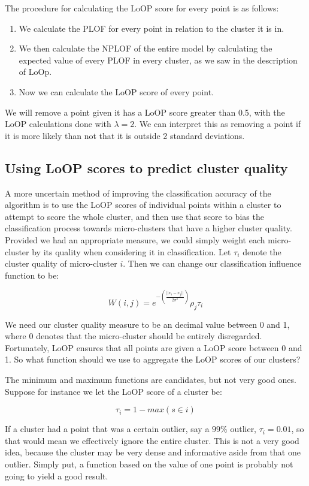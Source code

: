\documentclass[12pt,a4paper,oneside]{report}
\begin{document}
The procedure for calculating the LoOP score for every point is as follows:

\begin{enumerate}
\item We calculate the PLOF for every point in relation to the cluster it is in. 
\item We then calculate the NPLOF of the entire model by calculating the expected value of every PLOF in every cluster, as we saw in the description of LoOp. 
\item Now we can calculate the LoOP score of every point. 
\end{enumerate}

We will remove a point given it has a LoOP score greater than 0.5, with the LoOP calculations done with $\lambda = 2$. We can interpret this as removing a point if it is more likely than not that it is outside 2 standard deviations. 

\subsection{Using LoOP scores to predict cluster quality}

A more uncertain method of improving the classification accuracy of the algorithm is to use the LoOP scores of individual points within a cluster to attempt to score the whole cluster, and then use that score to bias the classification process towards micro-clusters that have a higher cluster quality. Provided we had an appropriate measure, we could simply weight each micro-cluster by its quality when considering it in classification. Let $\tau_i$ denote the cluster quality of micro-cluster $i$. Then we can change our classification influence function to be:

\[W(i,j) = e^{-(\frac{||x_i-x_j||}{2\sigma^2})}\rho_j\tau_i\]

We need our cluster quality measure to be an decimal value between 0 and 1, where 0 denotes that the micro-cluster should be entirely disregarded. Fortunately, LoOP ensures that all points are given a LoOP score between 0 and 1. So what function should we use to aggregate the LoOP scores of our clusters?

The minimum and maximum functions are candidates, but not very good ones. Suppose for instance we let the LoOP score of a cluster be:

\[ \tau_i = 1-max(s \in i)\]

If a cluster had a point that was a certain outlier, say a $99\%$ outlier, $\tau_i = 0.01$, so that would mean we  effectively ignore the entire cluster. This is not a very good idea, because the cluster may be very dense and informative aside from that one outlier. Simply put, a function based on the value of one point is probably not going to yield a good result. 
\end{document}
